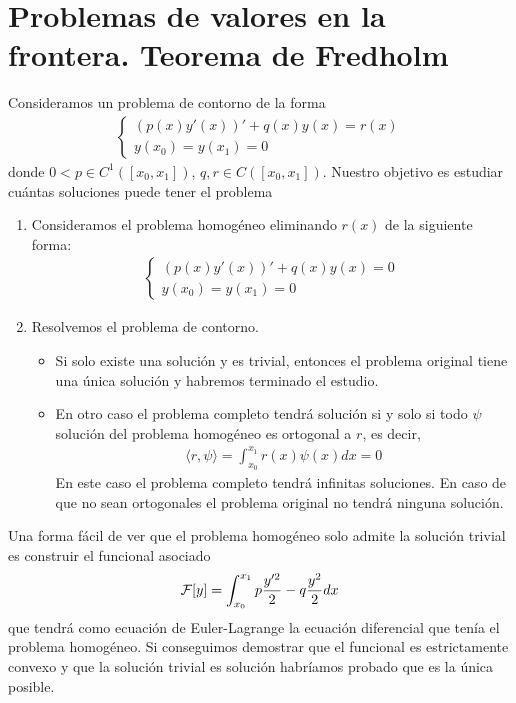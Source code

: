 \documentclass[12pt]{book}
\begin{document}
    \section{Problemas de valores en la frontera. Teorema de Fredholm}
    Consideramos un problema de contorno de la forma 
    \begin{gather*}
        \left\{
        \begin{array}{l}
            (p(x)y'(x))' + q(x)y(x) = r(x)\\
            y(x_0) = y(x_1) = 0
        \end{array}
        \right.
    \end{gather*}   
    donde $0<p\in C^1([x_0, x_1])$, $q,r\in C([x_0, x_1])$. 
    Nuestro objetivo es estudiar cuántas soluciones puede tener el problema
    \begin{enumerate}
        \item Consideramos el problema homogéneo eliminando $r(x)$ de la siguiente forma:
        \begin{gather*}
            \left\{
            \begin{array}{l}
                (p(x)y'(x))' + q(x)y(x) = 0\\
                y(x_0) = y(x_1) = 0
            \end{array}
            \right.
        \end{gather*}  
        \item Resolvemos el problema de contorno.
        \begin{itemize}
            \item Si solo existe una solución y es trivial, entonces el problema original tiene una única solución y habremos terminado el estudio.
            \item En otro caso el problema completo tendrá solución si y solo si todo $\psi$ solución del problema homogéneo es ortogonal a $r$, es decir,
            \begin{gather*}
                \langle r, \psi \rangle = \int_{x_0}^{x_1} r(x)\psi(x)dx = 0
            \end{gather*}
            En este caso el problema completo tendrá infinitas soluciones. En caso de que no sean ortogonales el problema original no tendrá ninguna solución.
        \end{itemize}
    \end{enumerate}
    \begin{observacion}
        Una forma fácil de ver que el problema homogéneo solo admite la solución trivial es construir el funcional asociado
        \begin{gather*}
            \mathcal{F}[y] = \int_{x_0}^{x_1} p \frac{y'^2}{2} - q \frac{y^2}{2} dx
        \end{gather*}
        que tendrá como ecuación de Euler-Lagrange la ecuación diferencial que tenía el problema homogéneo. Si conseguimos demostrar que el funcional es estrictamente convexo y que la solución trivial es solución habríamos probado que es la única posible.
    \end{observacion}
\end{document}
